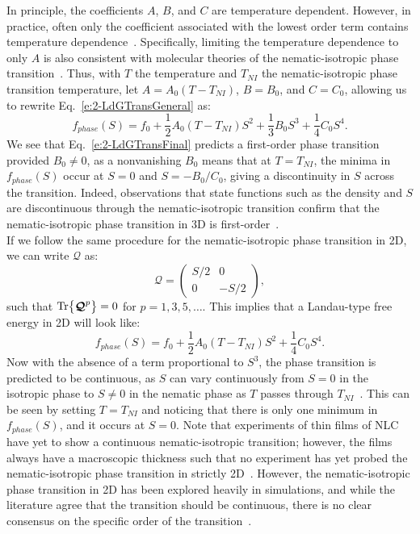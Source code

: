 In principle, the coefficients $A$, $B$, and $C$ are temperature dependent.
However, in practice, often only the coefficient associated with the lowest order term contains temperature dependence~\cite{RN33,RN175}.
Specifically, limiting the temperature dependence to only $A$ is also consistent with molecular theories of the nematic-isotropic phase transition~\cite{RN33}.
Thus, with $T$ the temperature and $T_{NI}$ the nematic-isotropic phase transition temperature, let $A = A_0(T-T_{NI})$, $B = B_0$, and $C = C_0$, allowing us to rewrite Eq.~\ref{e:2-LdGTransGeneral} as:
\begin{equation}
  f_{phase}(S) = f_0 + \frac{1}{2}A_0(T-T_{NI}) S^2 + \frac{1}{3}B_0 S^3 + \frac{1}{4}C_0 S^4.\label{e:2-LdGTransFinal}
\end{equation}
We see that Eq.~\ref{e:2-LdGTransFinal} predicts a first-order phase transition provided $B_0 \neq  0$, as a nonvanishing $B_0$ means that at $T = T_{NI}$, the minima in $f_{phase}(S)$ occur at $S = 0$ and $S = -B_0/C_0$, giving a discontinuity in $S$ across the transition.
Indeed, observations that state functions such as the density and $S$ are discontinuous through the nematic-isotropic transition confirm that the nematic-isotropic phase transition in 3D is first-order~\cite{RN33}. \\

If we follow the same procedure for the nematic-isotropic phase transition in 2D, we can write $\bm{\mathcal{Q}}$ as:
\begin{equation}
  \bm{\mathcal{Q}} =
  \begin{pmatrix}
    S/2 & 0 \\
    0 & -S/2
  \end{pmatrix},
\end{equation}
such that $\textup{Tr} \big \{ \bm{\mathcal{Q}}^p \big \} = 0$ for $p = 1,3,5,\dots$.
This implies that a Landau-type free energy in 2D will look like:
\begin{equation}
  f_{phase}(S) = f_0 + \frac{1}{2}A_0(T-T_{NI}) S^2 + \frac{1}{4}C_0 S^4.
\end{equation}
Now with the absence of a term proportional to $S^3$, the phase transition is predicted to be continuous, as $S$ can vary continuously from $S=0$ in the isotropic phase to $S \neq 0$ in the nematic phase as $T$ passes through $T_{NI}$~\cite{RN33}.
This can be seen by setting $T = T_{NI}$ and noticing that there is only one minimum in $f_{phase}(S)$, and it occurs at $S=0$.
Note that experiments of thin films of NLC have yet to show a continuous nematic-isotropic transition; however, the films always have a macroscopic thickness such that no experiment has yet probed the nematic-isotropic phase transition in strictly 2D~\cite{RN231}.
However, the nematic-isotropic phase transition in 2D has been explored heavily in simulations, and while the literature agree that the transition should be continuous, there is no clear consensus on the specific order of the transition~\cite{RN172}.


